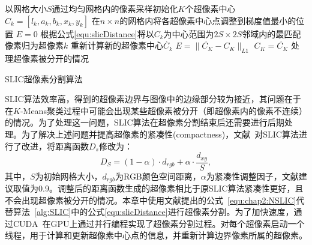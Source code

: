 \renewcommand{\algorithmcfname}{算法}
\begin{algorithm}[htb]
\LinesNumbered
{}
 以网格大小$S$通过均匀网格内的像素采样初始化$K$个超像素中心$C_k = [l_k,a_k,b_k,x_k,y_k]$\;
 在$n \times n$的网格内将各超像素中心点调整到梯度值最小的位置\;
 $ E = 0 $\;
 {
    {
        根据公式\ref{equ:slicDistance}将以$C_k$为中心范围为$2S \times 2S $邻域内的最匹配像素归为超像素$k$\;
    }
    重新计算新的超像素中心$\acute{C_k}$\;
    $E = \|\acute{C_K}-C_K\|_{L1}$\;
    $C_K = \acute{C_K}$\;
 }
 处理超像素被分开的情况\;
\caption{SLIC超像素分割算法\cite{SLIC}}
\label{alg:SLIC}

\end{algorithm}
SLIC算法效率高，得到的超像素边界与图像中的边缘部分较为接近，其问题在于在$K$-Means聚类过程中可能会出现某些超像素被分开（即超像素内的像素不连续）的情况。为了处理这一问题，SLIC算法在超像素分割结束后还需要进行后期处理。为了解决上述问题并提高超像素的紧凑性(compactness)，文献~对SLIC算法进行了改进，将距离函数$D_s$修改为：
\begin{equation}
\label{equ:chap2:NSLIC}
D_S = (1-\alpha) \cdot d_{rgb} + \alpha \cdot \frac{d_{xy}}{S},
\end{equation}
其中，$S$为初始网格大小，$d_{rgb}$为RGB颜色空间距离，$\alpha$为紧凑性调整因子，文献\cite{superpixel}建议取值为0.9。调整后的距离函数生成的超像素相比于原SLIC算法紧凑性更好，且不会出现超像素被分开的情况。本章中使用文献提出的公式~\ref{equ:chap2:NSLIC}代替算法~\ref{alg:SLIC}中的公式\ref{equ:slicDistance}进行超像素分割。为了加快速度，通过CUDA~\cite{CUDA}在GPU上通过并行编程实现了超像素分割过程。对每个超像素启动一个线程，用于计算和更新超像素中心点的信息，并重新计算边界像素所属的超像素。
